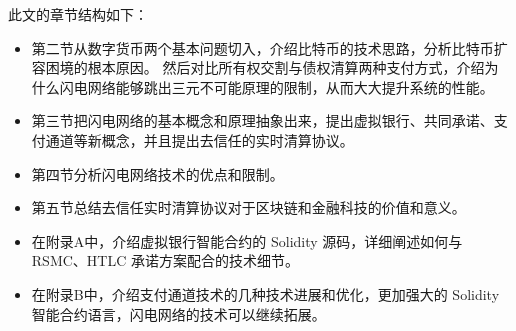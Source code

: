 此文的章节结构如下：

\begin{itemize}
    \item 第二节从数字货币两个基本问题切入，介绍比特币的技术思路，分析比特币扩容困境的根本原因。
          然后对比所有权交割与债权清算两种支付方式，介绍为什么闪电网络能够跳出三元不可能原理的限制，从而大大提升系统的性能。
    \item 第三节把闪电网络的基本概念和原理抽象出来，提出虚拟银行、共同承诺、支付通道等新概念，并且提出去信任的实时清算协议。
    \item 第四节分析闪电网络技术的优点和限制。
    \item 第五节总结去信任实时清算协议对于区块链和金融科技的价值和意义。
    \item 在附录A中，介绍虚拟银行智能合约的 Solidity 源码，详细阐述如何与 RSMC、HTLC 承诺方案配合的技术细节。
    \item 在附录B中，介绍支付通道技术的几种技术进展和优化，更加强大的 Solidity 智能合约语言，闪电网络的技术可以继续拓展。
\end{itemize}
